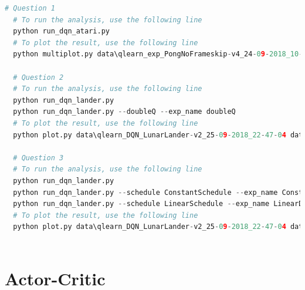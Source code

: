 \documentclass[12pt]{article}
\begin{document}
  \begin{lstlisting}[language=Python]
  # Question 1
  # To run the analysis, use the following line
  python run_dqn_atari.py
  # To plot the result, use the following line
  python multiplot.py data\qlearn_exp_PongNoFrameskip-v4_24-09-2018_10-10-51 --value best_mean_reward mean_reward_(100_episodes) --legend best_mean_reward mean_reward_(100_episodes)
  
  # Question 2
  # To run the analysis, use the following line
  python run_dqn_lander.py
  python run_dqn_lander.py --doubleQ --exp_name doubleQ
  # To plot the result, use the following line
  python plot.py data\qlearn_DQN_LunarLander-v2_25-09-2018_22-47-04 data\qlearn_doubleQ_LunarLander-v2_27-09-2018_18-56-47 --value best_mean_reward
  
  # Question 3
  # To run the analysis, use the following line
  python run_dqn_lander.py
  python run_dqn_lander.py --schedule ConstantSchedule --exp_name ConstantDQN
  python run_dqn_lander.py --schedule LinearSchedule --exp_name LinearDQN
  # To plot the result, use the following line
  python plot.py data\qlearn_DQN_LunarLander-v2_25-09-2018_22-47-04 data\qlearn_ConstantDQN_LunarLander-v2_25-09-2018_23-52-17 data\qlearn_LinearDQN_LunarLander-v2_26-09-2018_00-15-31 --value best_mean_reward
  
  \end{lstlisting}
  
  \pagebreak
   
   

  \section{Actor-Critic}
\end{document}
